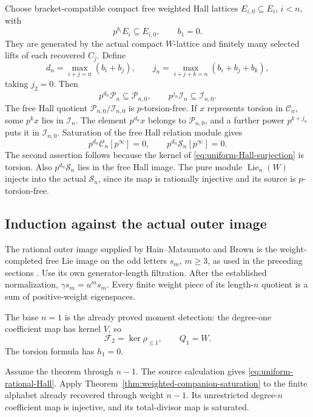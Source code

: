 Choose bracket-compatible compact free weighted Hall lattices
\(E_{i,0}\subseteq E_i\), \(i<n\), with
\[
 p^{b_i}E_i\subseteq E_{i,0},\qquad b_1=0.
\]
They are generated by the actual compact \(W\)-lattice and
finitely many selected lifts of each recovered \(C_j\).
Define
\begin{equation}\label{eq:uniform-bounds}
 d_n=\max_{i+j=n}(b_i+b_j),\qquad
 j_n=\max_{i+j+k=n}(b_i+b_j+b_k),
\end{equation}
taking \(j_2=0\).  Then
\[
 p^{d_n}\mathcal P_n\subseteq\mathcal P_{n,0},\qquad
 p^{j_n}\mathcal I_n\subseteq\mathcal I_{n,0}.
\]
The free Hall quotient
\(\mathcal P_{n,0}/\mathcal I_{n,0}\) is
\(p\)-torsion-free.  If \(x\) represents torsion in
\(\mathcal C_n\), some \(p^kx\) lies in \(\mathcal I_n\).
The element \(p^{d_n}x\) belongs to \(\mathcal P_{n,0}\),
and a further power \(p^{k+j_n}\) puts it in
\(\mathcal I_{n,0}\).  Saturation of the free Hall relation
module gives
\begin{equation}\label{eq:uniform-S-torsion}
 p^{d_n}\mathcal C_n[p^\infty]=0,\qquad
 p^{d_n}\mathcal S_n[p^\infty]=0.
\end{equation}
The second assertion follows because the kernel of
\eqref{eq:uniform-Hall-surjection} is torsion.
Also \(p^{d_n}\mathcal S_n\) lies in the free Hall image.
The pure module \(\operatorname{Lie}_n(W)\) injects into
the actual \(\mathcal S_n\), since its map is rationally injective
and its source is \(p\)-torsion-free.

\subsection{Induction against the actual outer image}

The rational outer image supplied by Hain--Matsumoto and
Brown is the weight-completed free Lie image on the odd
letters \(s_m\), \(m\geq3\), as used in the preceding
sections \cite{HM,Brown}.  Use its own generator-length
filtration.  After the established normalization,
\(\gamma s_m=u^m s_m\).  Every finite weight piece of
its length-\(n\) quotient is a sum of positive-weight
eigenspaces.

The base \(n=1\) is the already proved moment detection:
the degree-one coefficient map has kernel \(V\), so
\[
 \mathcal F_2=\ker\rho_{\leq1},\qquad Q_1=W.
\]
The torsion formula has \(h_1=0\).

Assume the theorem through \(n-1\).
The source calculation gives
\eqref{eq:uniform-rational-Hall}.  Apply
Theorem~\ref{thm:weighted-companion-saturation} to the
finite alphabet already recovered through weight \(n-1\).
Its unrestricted degree-\(n\) coefficient map is injective,
and its total-divisor map is saturated.

